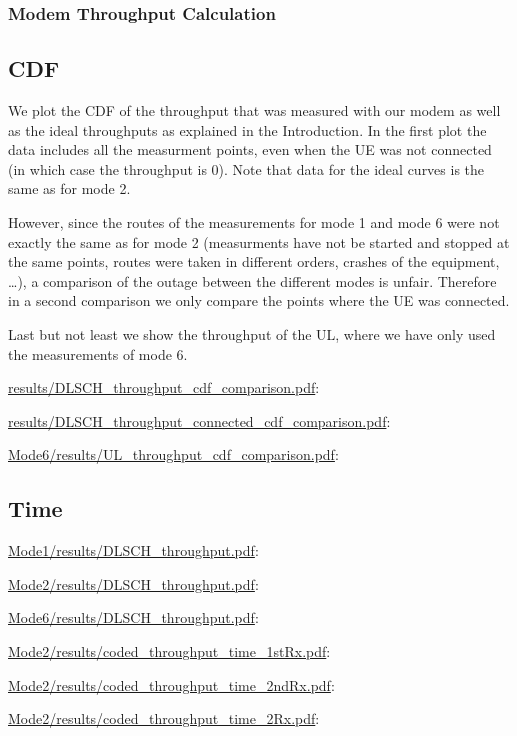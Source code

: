\documentclass[a4paper,10pt]{article}
\newcommand{\printfile}[2][]{
 \begin{minipage}{8cm}
  \centering
  \url{#2}: #1

 \end{minipage}
}
\begin{document}
\subsubsection{Modem Throughput Calculation}



\subsection{CDF}


We plot the CDF of the throughput that was measured with our modem as well as the ideal throughputs as explained in the Introduction. In the first plot the data includes all the measurment points, even when the UE was not connected (in which case the throughput is 0). Note that data for the ideal curves is the same as for mode 2. 

However, since the routes of the measurements for mode 1 and mode 6 were not exactly the same as for mode 2 (measurments have not be started and stopped at the same points, routes were taken in different orders, crashes of the equipment, \ldots), a comparison of the outage between the different modes is unfair. Therefore in a second comparison we only compare the points where the UE was connected. 

Last but not least we show the throughput of the UL, where we have only used the measurements of mode 6.

\printfile{results/DLSCH_throughput_cdf_comparison.pdf}
\printfile{results/DLSCH_throughput_connected_cdf_comparison.pdf}

\printfile{Mode6/results/UL_throughput_cdf_comparison.pdf}


\subsection{Time}

\printfile{Mode1/results/DLSCH_throughput.pdf}
\printfile{Mode2/results/DLSCH_throughput.pdf}

\printfile{Mode6/results/DLSCH_throughput.pdf}
\printfile{Mode2/results/coded_throughput_time_1stRx.pdf}

\printfile{Mode2/results/coded_throughput_time_2ndRx.pdf}
\printfile{Mode2/results/coded_throughput_time_2Rx.pdf}
\end{document}

